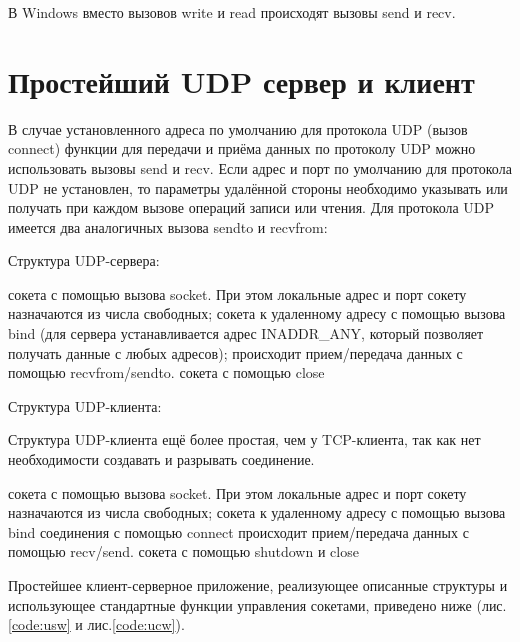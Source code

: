 В Windows вместо вызовов write и read происходят вызовы send и recv.  

\section{Простейший UDP сервер и клиент}

В случае установленного адреса по умолчанию для протокола UDP (вызов connect) функции для передачи и приёма данных по протоколу UDP можно использовать вызовы send и recv. Если адрес и порт по умолчанию для протокола UDP не установлен, то параметры удалённой стороны необходимо указывать или получать при каждом вызове операций записи или чтения. Для протокола UDP имеется два аналогичных вызова sendto и recvfrom:


\parindent=1cm


Структура UDP-сервера:
\vspace{3mm}

\begin{enumerate}
 сокета с помощью вызова socket. При этом локальные адрес и порт сокету назначаются из числа свободных;  
 сокета к удаленному адресу с помощью вызова bind (для сервера устанавливается адрес INADDR\_ANY, который позволяет получать данные с любых адресов); 
 происходит прием/передача данных с помощью recvfrom/sendto.
 сокета с помощью close
\end{enumerate}

Структура UDP-клиента:
\vspace{3mm}

Структура UDP-клиента ещё более простая, чем у TCP-клиента, так как нет необходимости создавать и разрывать соединение.


\begin{enumerate}
 сокета с помощью вызова socket. При этом локальные адрес и порт сокету назначаются из числа свободных;  
 сокета к удаленному адресу с помощью вызова bind
 соединения с помощью connect
 происходит прием/передача данных с помощью recv/send.
 сокета с помощью shutdown и close
\end{enumerate}

Простейшее клиент-серверное приложение, реализующее описанные структуры и использующее стандартные функции управления сокетами, приведено ниже (лис.\ref{code:usw} и лис.\ref{code:ucw}).

